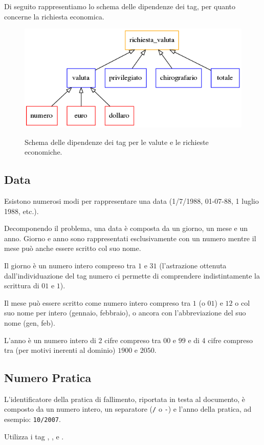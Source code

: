 Di seguito rappresentiamo lo schema delle dipendenze dei tag, per quanto concerne la richiesta economica.

\begin{figure}[H]
\centering
\includegraphics[width=.7\textwidth]{img/valuta.png}
\label{fig:valuta}
\caption[Dipendenze tra tag - Valute]{Schema delle dipendenze dei tag per le valute e le richieste economiche.}
\end{figure}

\subsection{Data}
Esistono numerosi modi per rappresentare una data (1/7/1988, 01-07-88, 1 luglio 1988, etc.).

Decomponendo il problema, una data è composta da un giorno, un mese e un anno.
Giorno e anno sono rappresentati esclusivamente con un numero mentre il mese può anche essere scritto col suo nome.

Il giorno è un numero intero compreso tra $1$ e $31$ (l'astrazione ottenuta dall'individuazione del tag numero ci permette di comprendere indistintamente la scrittura di $01$ e $1$).

Il mese può essere scritto come numero intero compreso tra $1$ (o $01$) e $12$ o col suo nome per intero (gennaio, febbraio), o ancora con l'abbreviazione del suo nome (gen, feb).

L'anno è un numero intero di 2 cifre compreso tra $00$ e $99$ e di 4 cifre compreso tra (per motivi inerenti al dominio) $1900$ e $2050$.

\subsection{Numero Pratica}
L'identificatore della pratica di fallimento, riportata in testa al documento, è composto da un numero intero, un separatore (\verb|/| o \verb|-|) e l'anno della pratica, ad esempio: \verb|10/2007|.

Utilizza i tag , , e .


